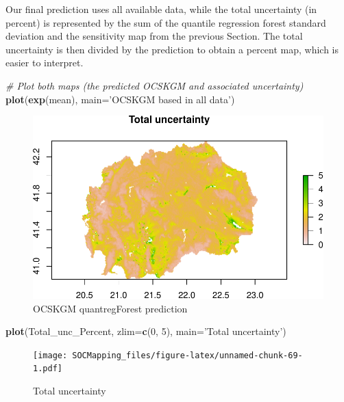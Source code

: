 \documentclass[10pt,b5paper,]{book}
\newenvironment{Shaded}{\begin{snugshade}}{\end{snugshade}}
\newcommand{\CommentTok}[1]{\textcolor[rgb]{0.56,0.35,0.01}{\textit{#1}}}
\newcommand{\DataTypeTok}[1]{\textcolor[rgb]{0.13,0.29,0.53}{#1}}
\newcommand{\DecValTok}[1]{\textcolor[rgb]{0.00,0.00,0.81}{#1}}
\newcommand{\KeywordTok}[1]{\textcolor[rgb]{0.13,0.29,0.53}{\textbf{#1}}}
\newcommand{\NormalTok}[1]{#1}
\newcommand{\StringTok}[1]{\textcolor[rgb]{0.31,0.60,0.02}{#1}}
\theoremstyle{definition}
\theoremstyle{definition}
\theoremstyle{definition}
\theoremstyle{remark}
\begin{document}
Our final prediction uses all available data, while the total
uncertainty (in percent) is represented by the sum of the quantile
regression forest standard deviation and the sensitivity map from the
previous Section. The total uncertainty is then divided by the
prediction to obtain a percent map, which is easier to interpret.

\begin{Shaded}
\begin{Highlighting}[]
\CommentTok{# Plot both maps (the predicted OCSKGM and associated uncertainty)}
\KeywordTok{plot}\NormalTok{(}\KeywordTok{exp}\NormalTok{(mean), }\DataTypeTok{main=}\StringTok{'OCSKGM based in all data'}\NormalTok{)}
\end{Highlighting}
\end{Shaded}

\begin{figure}
\centering
\includegraphics{SOCMapping_files/figure-latex/unnamed-chunk-68-1.pdf}
\caption{\label{fig:unnamed-chunk-68}OCSKGM quantregForest prediction}
\end{figure}

\begin{Shaded}
\begin{Highlighting}[]
\KeywordTok{plot}\NormalTok{(Total_unc_Percent, }\DataTypeTok{zlim=}\KeywordTok{c}\NormalTok{(}\DecValTok{0}\NormalTok{, }\DecValTok{5}\NormalTok{), }\DataTypeTok{main=}\StringTok{'Total uncertainty'}\NormalTok{)}
\end{Highlighting}
\end{Shaded}

\begin{figure}
\centering
\texttt{[image: SOCMapping\_files/figure-latex/unnamed-chunk-69-1.pdf]}
\caption{\label{fig:unnamed-chunk-69}Total uncertainty}
\end{figure}
\end{document}
